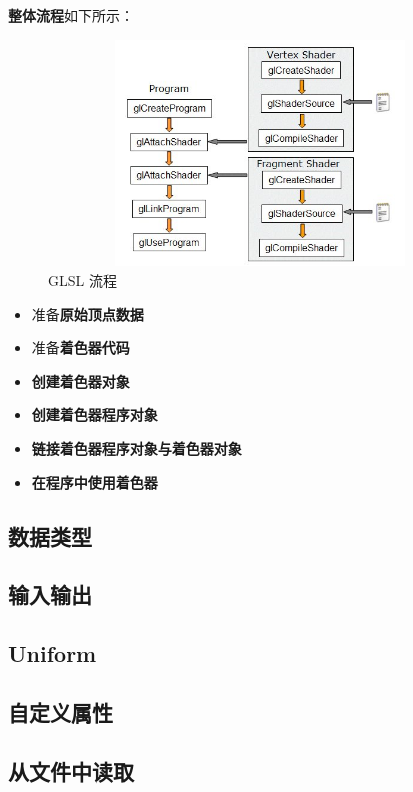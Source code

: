 \documentclass[UTF8,a4paper,12pt]{ctexbook}
\begin{document}
			\textbf{整体流程}如下所示：
			\begin{figure}[htbp]
				\centering
				\includegraphics[width = 12cm, height = 6cm]{GLSLProcess.png}
				\caption{GLSL 流程}
				\label{GLSL}
			\end{figure}
			
			\begin{itemize}[itemindent = 1em]
				\item 准备\textbf{原始顶点数据}
				\item 准备\textbf{着色器代码}
				\item \textbf{创建着色器对象}
				\item \textbf{创建着色器程序对象}
				\item \textbf{链接着色器程序对象与着色器对象}
				\item \textbf{在程序中使用着色器}
			\end{itemize}
			
		
		\subsection{数据类型}
		
		
		\subsection{输入输出}
		
		
		\subsection{Uniform}
		
		
		\subsection{自定义属性}
		
		
		\subsection{从文件中读取}		
		
\end{document}
